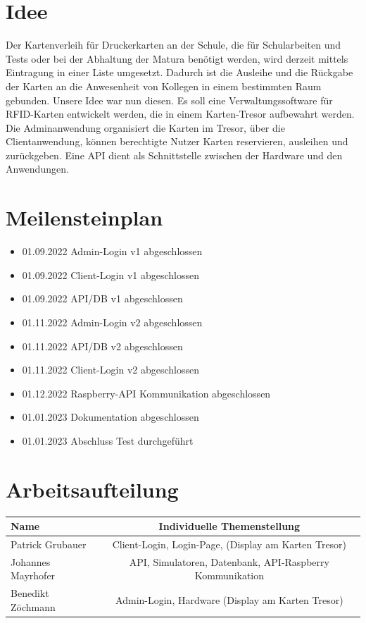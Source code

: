 

\section{Idee}
Der Kartenverleih für Druckerkarten an der Schule, die für Schularbeiten und Tests oder bei der Abhaltung der Matura benötigt werden, wird derzeit mittels Eintragung in einer Liste umgesetzt. Dadurch ist die Ausleihe und die Rückgabe der Karten an die Anwesenheit von Kollegen in einem bestimmten Raum gebunden. Unsere Idee war nun diesen.
Es soll eine Verwaltungssoftware für RFID-Karten entwickelt werden, die in einem Karten-Tresor aufbewahrt werden. Die Adminanwendung organisiert die Karten im Tresor, über die Clientanwendung, können berechtigte Nutzer Karten reservieren, ausleihen und zurückgeben. Eine API dient als Schnittstelle zwischen der Hardware und den Anwendungen.
\section{Meilensteinplan}
\begin{itemize}
\item 01.09.2022 Admin-Login v1 abgeschlossen
\item 01.09.2022 Client-Login v1 abgeschlossen
\item 01.09.2022 API/DB v1 abgeschlossen
\item 01.11.2022 Admin-Login v2 abgeschlossen
\item 01.11.2022 API/DB v2 abgeschlossen
\item 01.11.2022 Client-Login v2 abgeschlossen
\item 01.12.2022 Raspberry-API Kommunikation abgeschlossen
\item 01.01.2023 Dokumentation abgeschlossen
\item 01.01.2023 Abschluss Test durchgeführt 
\end{itemize}

\section{Arbeitsaufteilung}
\begin{tabular}[h]{l|c}
\textbf{Name} & \textbf{Individuelle Themenstellung}  \\
\hline
Patrick Grubauer & 	Client-Login, Login-Page, (Display am Karten Tresor)  \\
\hline
Johannes Mayrhofer & API, Simulatoren, Datenbank, API-Raspberry Kommunikation  \\
\hline
Benedikt Zöchmann & Admin-Login, Hardware (Display am Karten Tresor)
\end{tabular}

